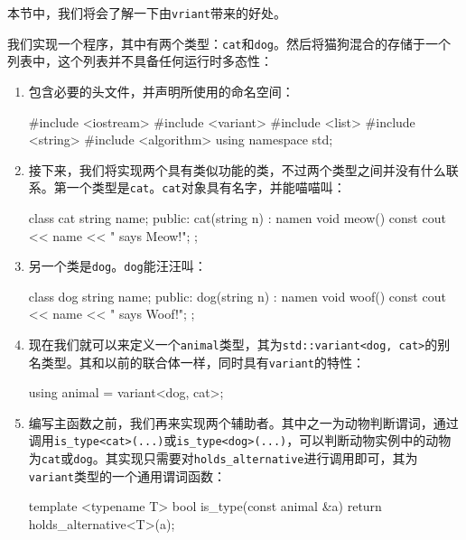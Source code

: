 本节中，我们将会了解一下由\texttt{vriant}带来的好处。


我们实现一个程序，其中有两个类型：\texttt{cat}和\texttt{dog}。然后将猫狗混合的存储于一个列表中，这个列表并不具备任何运行时多态性：

\begin{enumerate}
\item 包含必要的头文件，并声明所使用的命名空间：

\begin{codebox}[cpp]
#include <iostream>
#include <variant>
#include <list>
#include <string>
#include <algorithm>
using namespace std;
\end{codebox}

\item 接下来，我们将实现两个具有类似功能的类，不过两个类型之间并没有什么联系。第一个类型是\texttt{cat}。\texttt{cat}对象具有名字，并能喵喵叫：

\begin{codebox}[cpp]
class cat {
    string name;
public:
    cat(string n) : name{n} {}
    void meow() const {
        cout << name << " says Meow!\n";
    }
};
\end{codebox}

\item 另一个类是\texttt{dog}。\texttt{dog}能汪汪叫：

\begin{codebox}[cpp]
class dog {
    string name;
public:
    dog(string n) : name{n} {}
    void woof() const {
        cout << name << " says Woof!\n";
    }
};
\end{codebox}

\item 现在我们就可以来定义一个\texttt{animal}类型，其为\texttt{std::variant<dog, cat>}的别名类型。其和以前的联合体一样，同时具有\texttt{variant}的特性：

\begin{codebox}[cpp]
using animal = variant<dog, cat>;
\end{codebox}

\item 编写主函数之前，我们再来实现两个辅助者。其中之一为动物判断谓词，通过调用\texttt{is\_type<cat>(...)}或\texttt{is\_type<dog>(...)}，可以判断动物实例中的动物为\texttt{cat}或\texttt{dog}。其实现只需要对\texttt{holds\_alternative}进行调用即可，其为\texttt{variant}类型的一个通用谓词函数：

\begin{codebox}[cpp]
template <typename T>
bool is_type(const animal &a) {
    return holds_alternative<T>(a);
}
\end{codebox}


\end{enumerate}
